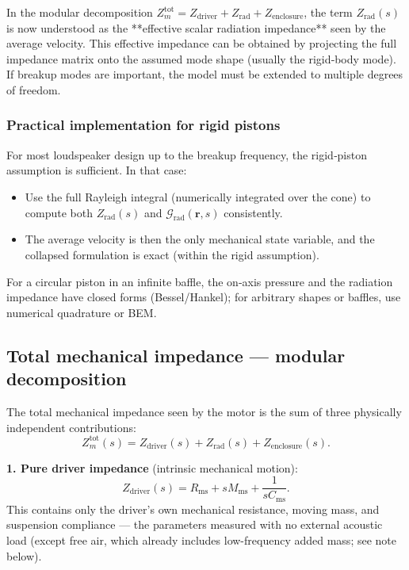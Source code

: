 In the modular decomposition \(Z_m^{\mathrm{tot}} = Z_{\mathrm{driver}} + Z_{\mathrm{rad}} + Z_{\mathrm{enclosure}}\), the term \(Z_{\mathrm{rad}}(s)\) is now understood as the **effective scalar radiation impedance** seen by the average velocity. This effective impedance can be obtained by projecting the full impedance matrix onto the assumed mode shape (usually the rigid‑body mode). If breakup modes are important, the model must be extended to multiple degrees of freedom.

\subsubsection{Practical implementation for rigid pistons}

For most loudspeaker design up to the breakup frequency, the rigid‑piston assumption is sufficient. In that case:
\begin{itemize}
  \item Use the full Rayleigh integral (numerically integrated over the cone) to compute both \(Z_{\mathrm{rad}}(s)\) and \(\mathcal{G}_{\mathrm{rad}}(\mathbf{r},s)\) consistently.
  \item The average velocity is then the only mechanical state variable, and the collapsed formulation is exact (within the rigid assumption).
\end{itemize}
For a circular piston in an infinite baffle, the on‑axis pressure and the radiation impedance have closed forms (Bessel/Hankel); for arbitrary shapes or baffles, use numerical quadrature or BEM.

\subsection{Total mechanical impedance — modular decomposition}

The total mechanical impedance seen by the motor is the sum of three physically independent contributions:
\[
\boxed{Z_m^{\mathrm{tot}}(s)=Z_{\mathrm{driver}}(s)+Z_{\mathrm{rad}}(s)+Z_{\mathrm{enclosure}}(s)}.
\]

\noindent
\textbf{1. Pure driver impedance} (intrinsic mechanical motion):
\[
\boxed{Z_{\mathrm{driver}}(s)=R_{\mathrm{ms}}+sM_{\mathrm{ms}}+\frac{1}{sC_{\mathrm{ms}}}}.
\]
This contains only the driver's own mechanical resistance, moving mass, and suspension compliance — the parameters measured with no external acoustic load (except free air, which already includes low-frequency added mass; see note below).

